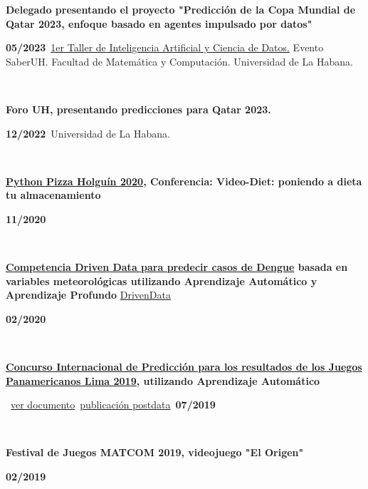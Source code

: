 \documentclass{article}
\begin{document}
\begin{minipage}{0.8\textwidth}
\parbox{0.8\linewidth}{\textbf{Delegado presentando el proyecto "Predicción de la Copa Mundial de Qatar 2023, enfoque basado en agentes impulsado por datos"}} \hfill \textbf{05/2023}\
\hyperref[sec:workshop]{1er Taller de Inteligencia Artificial y Ciencia de Datos.} Evento SaberUH. Facultad de Matemática y Computación. Universidad de La Habana.\
\end{minipage} \
\begin{minipage}{0.8\textwidth}
\parbox{0.8\linewidth}{\textbf{Foro UH, presentando predicciones para Qatar 2023.}} \hfill \textbf{12/2022}\
Universidad de La Habana.\
\end{minipage}\
\begin{minipage}{0.8\textwidth}
\parbox{0.8\linewidth}{\textbf{\hyperref[sec:pythonpizza]{Python Pizza Holguín 2020}, Conferencia: Video-Diet: poniendo a dieta tu almacenamiento}} \hfill \textbf{11/2020}\
\end{minipage} \
\begin{minipage}{0.8\textwidth}
\parbox{0.8\linewidth}{\textbf{\hyperref[sec:dengue]{Competencia Driven Data para predecir casos de Dengue} basada en variables meteorológicas utilizando Aprendizaje Automático y Aprendizaje Profundo} \href{https://www.drivendata.org/competitions/44/dengai-predicting-disease-spread}{DrivenData}} \hfill \textbf{02/2020}\
\
\end{minipage} \hfill {}\\
\begin{minipage}{0.8\textwidth}
\parbox{0.8\linewidth}{\textbf{\hyperref[sec:panamerican]{Concurso Internacional de Predicción para los resultados de los Juegos Panamericanos Lima 2019}, utilizando Aprendizaje Automático} }\
\href{https://github.com/JavierOramas/PanamericanPredictor/blob/master/panamerican_predictor_paper.pdf}{ver documento}\
\href{http://www.postdata.club/issues/201907/el-medallero-de-lima-2019-que-se-puede-esperar.html}{publicación postdata}\
\hfill \textbf{07/2019}\
\
\end{minipage} \hfill {}\\
\begin{minipage}{0.8\textwidth}
\parbox{0.8\linewidth}{\textbf{Festival de Juegos MATCOM 2019, videojuego "El Origen"}} \hfill \textbf{02/2019}\
\
\end{minipage}\
\end{document}
